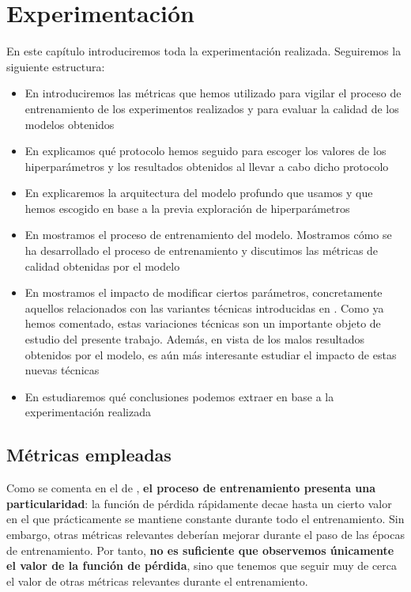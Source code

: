 \chapter{Experimentación} \label{ich:Experimentación}

En este capítulo introduciremos toda la experimentación realizada. Seguiremos la siguiente estructura:

\begin{itemize}
    \item En  introduciremos las métricas que hemos utilizado para vigilar el proceso de entrenamiento de los experimentos realizados y para evaluar la calidad de los modelos obtenidos
    \item En  explicamos qué protocolo hemos seguido para escoger los valores de los hiperparámetros y los resultados obtenidos al llevar a cabo dicho protocolo
    \item En  explicaremos la arquitectura del modelo profundo que usamos y que hemos escogido en base a la previa exploración de hiperparámetros
    \item En  mostramos el proceso de entrenamiento del modelo. Mostramos cómo se ha desarrollado el proceso de entrenamiento y discutimos las métricas de calidad obtenidas por el modelo
    \item En  mostramos el impacto de modificar ciertos parámetros, concretamente aquellos relacionados con las variantes técnicas introducidas en . Como ya hemos comentado, estas variaciones técnicas son un importante objeto de estudio del presente trabajo. Además, en vista de los malos resultados obtenidos por el modelo, es aún más interesante estudiar el impacto de estas nuevas técnicas
    \item En  estudiaremos qué conclusiones podemos extraer en base a la experimentación realizada
\end{itemize}

\section{Métricas empleadas} \label{isec:metricas_teoria}

Como se comenta en el  de \cite{informatica:principal}, \textbf{el proceso de entrenamiento presenta una particularidad}: la función de pérdida rápidamente decae hasta un cierto valor en el que prácticamente se mantiene constante durante todo el entrenamiento. Sin embargo, otras métricas relevantes deberían mejorar durante el paso de las épocas de entrenamiento. Por tanto, \textbf{no es suficiente que observemos únicamente el valor de la función de pérdida}, sino que tenemos que seguir muy de cerca el valor de otras métricas relevantes durante el entrenamiento.

